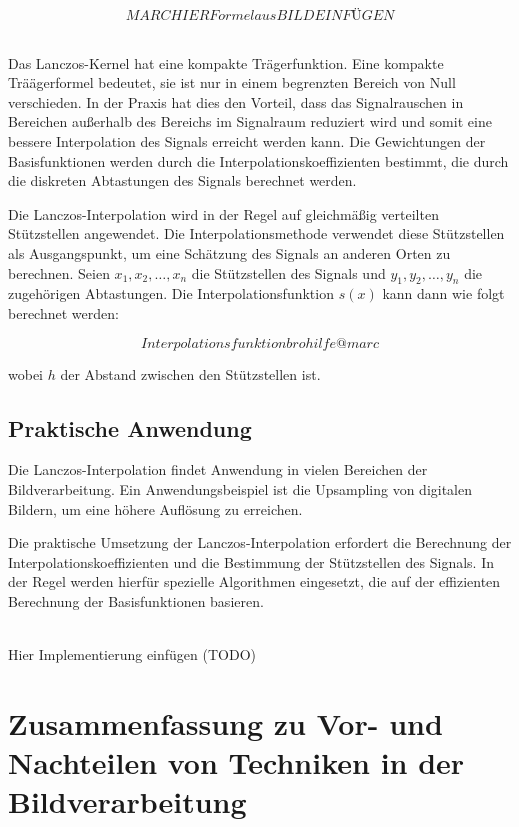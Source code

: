 \begin{equation}
MARC HIER Formel aus BILD EINFÜGEN
\end{equation}
~

Das Lanczos-Kernel hat eine kompakte Trägerfunktion.
Eine kompakte Träägerformel bedeutet, sie ist nur in einem begrenzten Bereich von Null verschieden. 
In der Praxis hat dies den Vorteil, dass das Signalrauschen in Bereichen außerhalb des Bereichs im Signalraum reduziert wird und somit eine bessere Interpolation des Signals erreicht werden kann.
Die Gewichtungen der Basisfunktionen werden durch die Interpolationskoeffizienten bestimmt, die durch die diskreten Abtastungen des Signals berechnet werden.

Die Lanczos-Interpolation wird in der Regel auf gleichmäßig verteilten Stützstellen angewendet. 
Die Interpolationsmethode verwendet diese Stützstellen als Ausgangspunkt, um eine Schätzung des Signals an anderen Orten zu berechnen. 
Seien $x_1, x_2, \ldots, x_n$ die Stützstellen des Signals und $y_1, y_2, \ldots, y_n$ die zugehörigen Abtastungen.
Die Interpolationsfunktion $s(x)$ kann dann wie folgt berechnet werden:

\begin{equation}
Interpolationsfunktion bro hilfe @marc
\end{equation}

wobei $h$ der Abstand zwischen den Stützstellen ist.
~

\subsection{Praktische Anwendung}

Die Lanczos-Interpolation findet Anwendung in vielen Bereichen der Bildverarbeitung. 
Ein Anwendungsbeispiel ist die Upsampling von digitalen Bildern, um eine höhere Auflösung zu erreichen.

Die praktische Umsetzung der Lanczos-Interpolation erfordert die Berechnung der Interpolationskoeffizienten und die Bestimmung der Stützstellen des Signals. 
In der Regel werden hierfür spezielle Algorithmen eingesetzt, die auf der effizienten Berechnung der Basisfunktionen basieren.

\\Hier Implementierung einfügen (TODO) 

\section{Zusammenfassung zu Vor- und Nachteilen von Techniken in der Bildverarbeitung}

